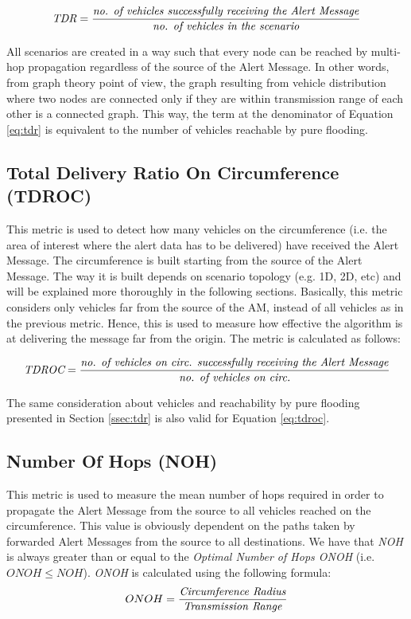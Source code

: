 			\begin{gather}
				\label{eq:tdr}
				\textit{TDR} = \frac{\textrm{\textit{no. of vehicles successfully receiving the Alert Message}}}{\textrm{\textit{no. of vehicles in the scenario}}}
			\end{gather}
			
			All scenarios are created in a way such that every node can be reached by multi-hop propagation regardless of the source of the Alert Message. In other words, from graph theory point of view, the graph resulting from vehicle distribution where two nodes are connected only if they are within transmission range of each other is a connected graph. This way, the term at the denominator of Equation \ref{eq:tdr} is equivalent to the number of vehicles reachable by pure flooding.
			
		\subsection{Total Delivery Ratio On Circumference (TDROC)}
			This metric is used to detect how many vehicles on the circumference (i.e. the area of interest where the alert data has to be delivered) have received the Alert Message. The circumference is built starting from the source of the Alert Message. The way it is built depends on scenario topology (e.g. 1D, 2D, etc) and will be explained more thoroughly in the following sections. Basically, this metric considers only vehicles far from the source of the AM, instead of all vehicles as in the previous metric. Hence, this is used to measure how effective the algorithm is at delivering the message far from the origin. The metric is calculated as follows:
			
			\begin{gather}
			 	\label{eq:tdroc}
			 	\textit{TDROC} = \frac{\textrm{\textit{no. of vehicles on circ. successfully receiving the Alert Message}}}{\textrm{\textit{no. of vehicles on circ.}}}
			\end{gather}
		
			The same consideration about vehicles and reachability by pure flooding presented in Section \ref{ssec:tdr} is also valid for Equation \ref{eq:tdroc}.
			
		\subsection{Number Of Hops (NOH)}
			This metric is used to measure the mean number of hops required in order to propagate the Alert Message from the source to all vehicles reached on the circumference. This value is obviously dependent on the paths taken by forwarded Alert Messages from the source to all destinations. We have that \textit{NOH} is always greater than or equal to the \textit{Optimal Number of Hops ONOH} (i.e. $ONOH \leq NOH$). \textit{ONOH} is calculated using the following formula:
			$$ ONOH = \frac{\textrm{\textit{Circumference Radius}}}{\textrm{\textit{Transmission Range}}} $$
			
